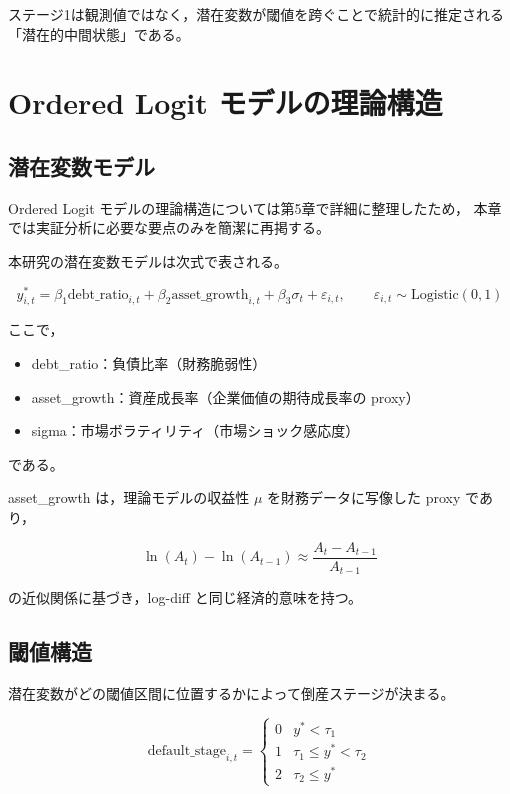 ステージ1は観測値ではなく，潜在変数が閾値を跨ぐことで統計的に推定される
「潜在的中間状態」である。

\section{Ordered Logit モデルの理論構造}
\label{sec:ordered_logit_theory}

\subsection{潜在変数モデル}

Ordered Logit モデルの理論構造については第5章で詳細に整理したため，
本章では実証分析に必要な要点のみを簡潔に再掲する。

本研究の潜在変数モデルは次式で表される。



\[
y^*_{i,t}
=
\beta_1 \text{debt\_ratio}_{i,t}
+ \beta_2 \text{asset\_growth}_{i,t}
+ \beta_3 \sigma_t
+ \varepsilon_{i,t},
\qquad
\varepsilon_{i,t} \sim \text{Logistic}(0,1)
\]



ここで，

\begin{itemize}
    \item debt\_ratio：負債比率（財務脆弱性）
    \item asset\_growth：資産成長率（企業価値の期待成長率の proxy）
    \item sigma：市場ボラティリティ（市場ショック感応度）
\end{itemize}

である。

asset\_growth は，理論モデルの収益性 $\mu$ を財務データに写像した proxy であり，



\[
\ln(A_t)-\ln(A_{t-1})
\approx
\frac{A_t-A_{t-1}}{A_{t-1}}
\]



の近似関係に基づき，log-diff と同じ経済的意味を持つ。

\subsection{閾値構造}

潜在変数がどの閾値区間に位置するかによって倒産ステージが決まる。



\[
\text{default\_stage}_{i,t} =
\begin{cases}
0 & y^* < \tau_1 \\
1 & \tau_1 \le y^* < \tau_2 \\
2 & \tau_2 \le y^*
\end{cases}
\]



